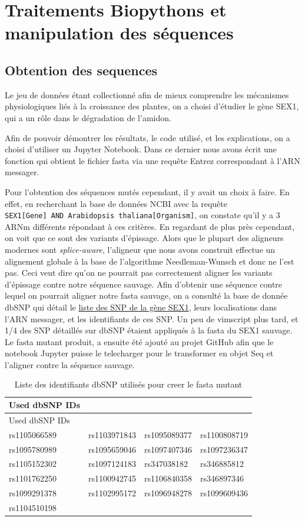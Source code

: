 \documentclass[11pt,french,]{article}
\begin{document}
\hypertarget{traitements-biopythons-et-manipulation-des-sequences}{%
\section{Traitements Biopythons et manipulation des
séquences}\label{traitements-biopythons-et-manipulation-des-sequences}}

\hypertarget{obtention-des-sequences}{%
\subsection{Obtention des sequences}\label{obtention-des-sequences}}

Le jeu de données étant collectionné afin de mieux comprendre les
mécanismes physiologiques liés à la croissance des plantes, on a choisi
d'étudier le gène SEX1, qui a un rôle dans le dégradation de l'amidon.

Afin de pouvoir démontrer les résultats, le code utilisé, et les
explications, on a choisi d'utiliser un Jupyter Notebook. Dans ce
dernier nous avons écrit une fonction qui obtient le fichier fasta via
une requête Entrez correspondant à l'ARN messager.

Pour l'obtention des séquences mutés cependant, il y avait un choix à
faire. En effet, en recherchant la base de données NCBI avec la requête
\texttt{SEX1{[}Gene{]}\ AND\ Arabidopsis\ thaliana{[}Organism{]}}, on
constate qu'il y a 3 ARNm différents répondant à ces critères. En
regardant de plus près cependant, on voit que ce sont des variants
d'épissage. Alors que le plupart des aligneurs modernes sont
\emph{splice-aware}, l'aligneur que nous avons construit effectue un
alignement globale à la base de l'algorithme Needleman-Wunsch et donc ne
l'est pas. Ceci veut dire qu'on ne pourrait pas correctement aligner les
variants d'épissage contre notre séquence sauvage. Afin d'obtenir une
séquence contre lequel on pourrait aligner notre fasta sauvage, on a
consulté la base de donnée dbSNP qui détail le
\href{https://www.ncbi.nlm.nih.gov/SNP/snp_ref.cgi?locusId=837619}{liste
des SNP de la gène SEX1}, leurs localisations dans l'ARN messager, et
les identifiants de ces SNP. Un peu de vimscript plus tard, et 1/4 des
SNP détaillés sur dbSNP étaient appliqués à la fasta du SEX1 sauvage. Le
fasta mutant produit, a ensuite été ajouté au projet GitHub afin que le
notebook Jupyter puisse le telecharger pour le transformer en objet Seq
et l'aligner contre la séquence sauvage.

\begin{longtable}[]{@{}llll@{}}
\caption{Liste des identifiants dbSNP utilisés pour creer le fasta
mutant}\tabularnewline
\toprule
Used dbSNP IDs & & &\tabularnewline
\midrule
\endfirsthead
\toprule
Used dbSNP IDs & & &\tabularnewline
\midrule
\endhead
rs1105066589 & rs1103971843 & rs1095089377 & rs1100808719\tabularnewline
rs1095780989 & rs1095659046 & rs1097407346 & rs1097236347\tabularnewline
rs1105152302 & rs1097124183 & rs347038182 & rs346885812\tabularnewline
rs1101762250 & rs1100942745 & rs1106840358 & rs346897346\tabularnewline
rs1099291378 & rs1102995172 & rs1096948278 & rs1099609436\tabularnewline
rs1104510198 & & &\tabularnewline
\bottomrule
\end{longtable}
\end{document}
